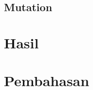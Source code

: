 \documentclass[conference]{IEEEtran}
\begin{document}
\subsection{Mutation}


\section{Hasil}
\cite{Nayak2021}

\section{Pembahasan}


\end{document}
